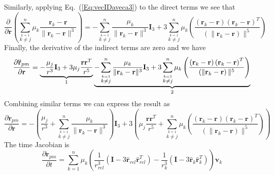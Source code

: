Similarly, applying Eq.~(\ref{Eq:vecIDaveca3}) to the direct terms
we see that
%
\begin{equation}
     \frac{\partial }{\partial \mathbf{r}} \left( \sum_{\stackrel{k=1}{k \neq j}}^{n} \mu_k \frac{\mathbf{r}_{k} -
     \mathbf{r}}{\| \mathbf{r}_{k} - \mathbf{r}\|^3}\right) =  -\sum_{\stackrel{k=1}{k \neq j}}^{n}
     \frac{\mu_k}{\| \mathbf{r}_{k} - \mathbf{r}\|^3}\mathbf{I}_3 + 3\sum_{\stackrel{k=1}{k \neq
     j}}^{n}\mu_k \left( \frac{\left( \mathbf{r}_{k} - \mathbf{r} \right)\left( \mathbf{r}_{k} -
     \mathbf{r} \right)^T}{\left( \|\mathbf{r}_{k} - \mathbf{r} \right)\|^5}  \right)
\end{equation}
%
Finally, the derivative of the indirect terms are zero and we have
%
\begin{equation}
   \frac{\partial \mathbf{\ddot{r}}_{pm}}{\partial \mathbf{r}} =  \underbrace{-\frac{\mu_j}{r^3} \mathbf{I}_3
     + 3\mu_j\frac{\mathbf{r}\mathbf{r}^T}{r^5}}_{ 1 }
     \underbrace{
     -  \sum_{\stackrel{k=1}{k \neq j}}^{n}
     \frac{\mu_k}{\| \mathbf{r}_{k} - \mathbf{r}\|^3}\mathbf{I}_3 + 3\sum_{\stackrel{k=1}{k \neq
     j}}^{n} \mu_k \left( \frac{\left( \mathbf{r}_{k} - \mathbf{r} \right)\left( \mathbf{r}_{k} -
     \mathbf{r} \right)^T}{\left( \|\mathbf{r}_{k} - \mathbf{r} \right)\|^5}  \right)
       }_{2}
\end{equation}
%
Combining similar terms we can express the result as
%
\begin{equation}
   \frac{\partial \mathbf{\ddot{r}}_{pm}}{\partial \mathbf{r}} =   -  \left( \frac{\mu_j}{r^3} + \sum_{\stackrel{k=1}{k \neq j}}^{n}
     \frac{\mu_k}{\| \mathbf{r}_{k} - \mathbf{r}\|^3} \right)\mathbf{I}_3
     + 3 \left( \mu_j\frac{\mathbf{r}\mathbf{r}^T}{r^5}
       + \sum_{\stackrel{k=1}{k \neq
     j}}^{n} \mu_k \left( \frac{\left( \mathbf{r}_{k} - \mathbf{r} \right)\left( \mathbf{r}_{k} -
     \mathbf{r} \right)^T}{\left( \|\mathbf{r}_{k} - \mathbf{r} \right)\|^5}
     \right) \right)
\end{equation}
%
The time Jacobian is 
%
\begin{equation}
    \frac{\partial \mathbf{\ddot{r}}_{pm}}{\partial t} = \sum_{k=1}^{n}\mu_k\left(
%    
    \frac{1}{r_{rel}^{3}}\left( \mathbf{I } - 3 \hat{\mathbf{r}}_{rel}\hat{\mathbf{r}}_{rel}^{T}\right)
%    
-
\frac{1}{r_{k}^{3}}\left( \mathbf{I } - 3 \hat{\mathbf{r}}_{k}\hat{\mathbf{r}}_{k}^{T}\right)
     \right)\mathbf{v}_k
\end{equation}